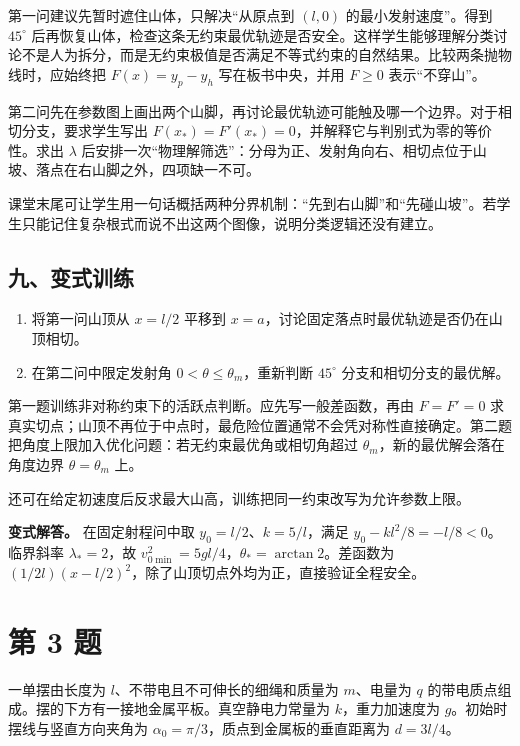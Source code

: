 \documentclass[12pt,a4paper,UTF8]{ctexart}
\newcommand{\tightlist}{\setlength{\itemsep}{0pt}\setlength{\parskip}{0pt}}
\begin{document}
第一问建议先暂时遮住山体，只解决``从原点到 \((l,0)\)
的最小发射速度''。得到 \(45^\circ\)
后再恢复山体，检查这条无约束最优轨迹是否安全。这样学生能够理解分类讨论不是人为拆分，而是无约束极值是否满足不等式约束的自然结果。比较两条抛物线时，应始终把
\(F(x)=y_p-y_h\) 写在板书中央，并用 \(F\geqslant0\) 表示``不穿山''。

第二问先在参数图上画出两个山脚，再讨论最优轨迹可能触及哪一个边界。对于相切分支，要求学生写出
\(F(x_*)=F'(x_*)=0\)，并解释它与判别式为零的等价性。求出 \(\lambda\)
后安排一次``物理解筛选''：分母为正、发射角向右、相切点位于山坡、落点在右山脚之外，四项缺一不可。

课堂末尾可让学生用一句话概括两种分界机制：``先到右山脚''和``先碰山坡''。若学生只能记住复杂根式而说不出这两个图像，说明分类逻辑还没有建立。

\subsection{九、变式训练}\label{ux4e5dux53d8ux5f0fux8badux7ec3-1}

\begin{enumerate}
\def\labelenumi{\arabic{enumi}.}
\tightlist
\item
  将第一问山顶从 \(x=l/2\) 平移到
  \(x=a\)，讨论固定落点时最优轨迹是否仍在山顶相切。
\item
  在第二问中限定发射角 \(0<\theta\leq\theta_m\)，重新判断 \(45^\circ\)
  分支和相切分支的最优解。
\end{enumerate}

第一题训练非对称约束下的活跃点判断。应先写一般差函数，再由 \(F=F'=0\)
求真实切点；山顶不再位于中点时，最危险位置通常不会凭对称性直接确定。第二题把角度上限加入优化问题：若无约束最优角或相切角超过
\(\theta_m\)，新的最优解会落在角度边界 \(\theta=\theta_m\) 上。

还可在给定初速度后反求最大山高，训练把同一约束改写为允许参数上限。

\textbf{变式解答。} 在固定射程问中取 \(y_0=l/2\)、\(k=5/l\)，满足
\(y_0-kl^2/8=-l/8<0\)。临界斜率 \(\lambda_*=2\)，故
\(v_{0\min}^2=5gl/4\)，\(\theta_* =\arctan2\)。差函数为
\((1/2l)(x-l/2)^2\)，除了山顶切点外均为正，直接验证全程安全。

\newpage

\section{第 3 题}\label{ux7b2c-3-ux9898}

一单摆由长度为 \(l\)、不带电且不可伸长的细绳和质量为 \(m\)、电量为 \(q\)
的带电质点组成。摆的下方有一接地金属平板。真空静电力常量为
\(k\)，重力加速度为 \(g\)。初始时摆线与竖直方向夹角为
\(\alpha_0=\pi/3\)，质点到金属板的垂直距离为 \(d=3l/4\)。
\end{document}

